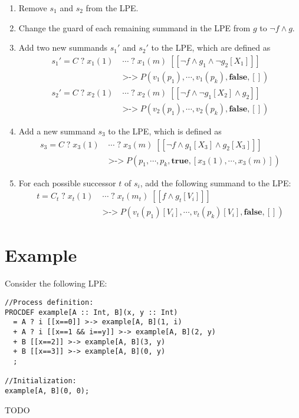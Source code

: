 \begin{enumerate}
\item Remove $s_1$ and $s_2$ from the LPE.

\item Change the guard of each remaining summand in the LPE from $g$ to $\neg f \land g$.

\item Add two new summands ${s_1}'$ and ${s_2}'$ to the LPE, which are defined as
\begin{align*}
{s_1}' = C \; \texttt{?} \; x_1(1) \; &\cdots{} \; \texttt{?} \; x_1(m) \; [[\neg f \land g_1 \land \neg g_2[X_1]]] \\
&\texttt{>->} \; P(v_1(p_1), \cdots{}, v_1(p_k), \textbf{false}, []) \\
{s_2}' = C \; \texttt{?} \; x_2(1) \; &\cdots{} \; \texttt{?} \; x_2(m) \; [[\neg f \land \neg g_1[X_2] \land g_2]] \\
&\texttt{>->} \; P(v_2(p_1), \cdots{}, v_2(p_k), \textbf{false}, [])
\end{align*}

\item Add a new summand $s_3$ to the LPE, which is defined as
\begin{align*}
s_3 = C \; \texttt{?} \; x_3(1) \; &\cdots{} \; \texttt{?} \; x_3(m) \; [[\neg f \land g_1[X_3] \land g_2[X_3]]] \\
&\texttt{>->} \; P(p_1, \cdots{}, p_k, \textbf{true}, [x_3(1), \cdots{}, x_3(m)])
\end{align*}

\item For each possible successor $t$ of $s_i$, add the following summand to the LPE:
\begin{align*}
t = C_t \; \texttt{?} \; x_t(1) \; &\cdots{} \; \texttt{?} \; x_t(m_t) \; [[f \land g_t[V_i]]] \\
&\texttt{>->} \; P(v_t(p_1)[V_i], \cdots{}, v_t(p_k)[V_i], \textbf{false}, [])
\end{align*}

\end{enumerate}

\section{Example}

Consider the following LPE:

\begin{lstlisting}
//Process definition:
PROCDEF example[A :: Int, B](x, y :: Int)
  = A ? i [[x==0]] >-> example[A, B](1, i)
  + A ? i [[x==1 && i==y]] >-> example[A, B](2, y)
  + B [[x==2]] >-> example[A, B](3, y)
  + B [[x==3]] >-> example[A, B](0, y)
  ;

//Initialization:
example[A, B](0, 0);
\end{lstlisting}

TODO

